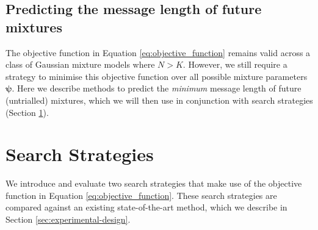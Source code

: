 \documentclass{elsarticle}
\newcommand{\vect}[1]{\boldsymbol{\mathbf{#1}}}
\renewcommand{\vec}[1]{\vect{#1}}
\begin{document}
\subsection{Predicting the message length of future mixtures}

The objective function in Equation \ref{eq:objective_function} remains valid across a class of 
Gaussian mixture models where $N > K$. However, we still require a strategy to minimise this
objective function over all possible mixture parameters $\vec{\psi}$. Here we describe methods to predict
the \emph{minimum} message length of future (untrialled) mixtures, which we will then use in conjunction 
with search strategies (Section \ref{sec:search}).







\section{Search Strategies} \label{sec:search}

We introduce and evaluate two search strategies that make use of the objective function in Equation \ref{eq:objective_function}. These search strategies are compared against an existing state-of-the-art method, which we describe in Section \ref{sec:experimental-design}.
\end{document}
